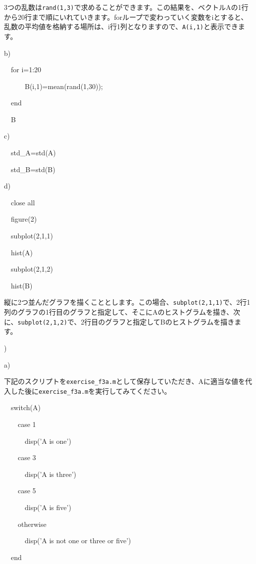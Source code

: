 \documentclass{jsarticle}
\begin{document}
\begin{screen}
3つの乱数は{\tt rand(1,3)}で求めることができます。この結果を、ベクトルAの1行から20行まで順にいれていきます。forループで変わっていく変数をiとすると、乱数の平均値を格納する場所は、i行1列となりますので、{\tt A(i,1)}と表示できます。
\end{screen}


\bigskip

b) {\tt 

\ \ for i=1:20

\ \ \ \ \ \ B(i,1)=mean(rand(1,30));

\ \ end

\ \ B
}

\bigskip

c) {\tt

\ \ std\_A=std(A)

\ \ std\_B=std(B)
}

\bigskip

d) {\tt

\ \ close all

\ \ figure(2)

\ \ subplot(2,1,1)

\ \ hist(A)

\ \ subplot(2,1,2)

\ \ hist(B)
}

\begin{screen}
縦に2つ並んだグラフを描くこととします。この場合、{\tt subplot(2,1,1)}で、2行1列のグラフの1行目のグラフと指定して、そこにAのヒストグラムを描き、次に、{\tt subplot(2,1,2)}で、2行目のグラフと指定してBのヒストグラムを描きます。
\end{screen}

\bigskip


)

a)

\begin{screen}
下記のスクリプトを{\tt exercise\_f3a.m}として保存していただき、Aに適当な値を代入した後に{\tt exercise\_f3a.m}を実行してみてください。
\end{screen}

{\tt

\ \ switch(A)

\ \ \ \ case 1

\ \ \ \ \ \ disp('A is one')

\ \ \ \ case 3

\ \ \ \ \ \ disp('A is three')

\ \ \ \ case 5

\ \ \ \ \ \ disp('A is five')

\ \ \ \ otherwise

\ \ \ \ \ \ disp('A is not one or three or five')

\ \ end
}
\end{document}
